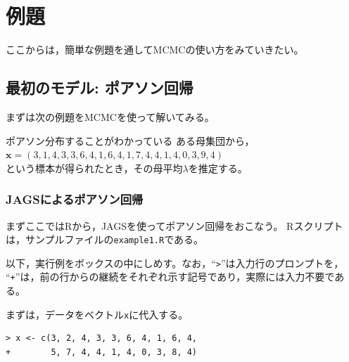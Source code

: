 \documentclass[11pt,uplatex]{jsarticle}
\begin{document}
\pagebreak

\section{例題}

ここからは，簡単な例題を通してMCMCの使い方をみていきたい。

\subsection{最初のモデル: ポアソン回帰}

まずは次の例題をMCMCを使って解いてみる。

\vspace{1zw}

\hspace{18mm}
\begin{minipage}{100mm}
\begin{breakbox}
ポアソン分布することがわかっている ある母集団から，\\
\hspace{10mm} $\bm{x} = (3, 1, 4, 3, 3, 6, 4, 1, 6, 4, 
       1, 7, 4, 4, 1, 4, 0, 3, 9, 4)$\\
という標本が得られたとき，その母平均$\lambda$を推定する。
\end{breakbox}
\end{minipage}

\vspace{1zw}

\subsubsection{JAGSによるポアソン回帰}

まずここでは\textsf{R}から，\textsf{JAGS}を使ってポアソン回帰をおこなう。
\textsf{R}スクリプトは，サンプルファイルの\texttt{example1.R}である。

\vspace{1.5zw}
\begin{screen}
以下，実行例をボックスの中にしめす。なお，``\texttt{>}''は入力行のプロンプトを，
``\texttt{+}''は，前の行からの継続をそれぞれ示す記号であり，実際には入力不要である。
\end{screen}
\vspace{0.5zw}

まずは，データをベクトル\texttt{x}に代入する。
\begin{lstlisting}
> x <- c(3, 2, 4, 3, 3, 6, 4, 1, 6, 4,
+        5, 7, 4, 4, 1, 4, 0, 3, 8, 4)
\end{lstlisting}
\end{document}
